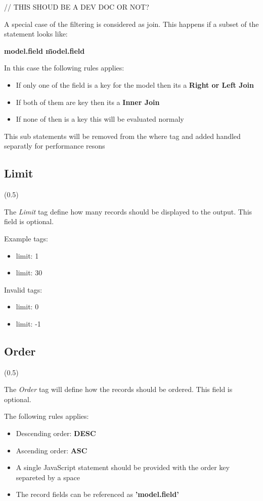 // THIS SHOUD BE A DEV DOC OR NOT?

A special case of the filtering is considered as join. 
This happens if a subset of the statement looks like:\newline

\textbf{{model}.{field} \=\= {model}.{field}}\newline

In this case the following rules applies:

\begin{itemize}
	\item If only one of the field is a key for the model then its a \textbf{Right or Left Join}
	\item If both of them are key then its a \textbf{Inner Join}
	\item If none of then is a key this will be evaluated normaly
\end{itemize}

This sub statements will be removed from the where tag and added handled separatly for performance resons

\subsection{Limit} (0.5)

The \textit{Limit} tag define how many records should be displayed to the output.
This field is optional.

Example tags:
\begin{itemize}
	\item limit: 1
	\item limit: 30
\end{itemize}

Invalid tags:
\begin{itemize}
	\item limit: 0
	\item limit: -1
\end{itemize}

\subsection{Order} (0.5)

The \textit{Order} tag will define how the records should be ordered.
This field is optional.

The following rules applies:

\begin{itemize}
	\item Descending order: \textbf{DESC}
	\item Ascending order: \textbf{ASC}
	\item A single JavaScript statement should be provided with the order key separeted by a space
	\item The record fields can be referenced as \textbf{'{model}.{field}'}
\end{itemize}

